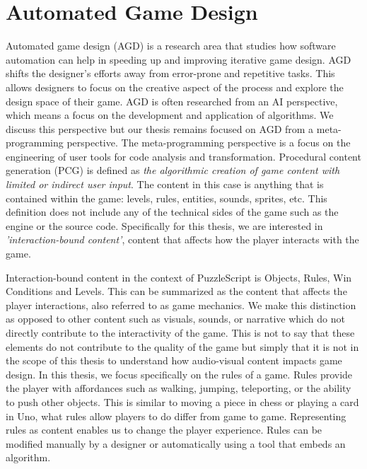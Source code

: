 \section{Automated Game Design}

Automated game design (AGD) is a research area that studies how software automation can help in speeding up and improving iterative game design. AGD shifts the designer's efforts away from error-prone and repetitive tasks. This allows designers to focus on the creative aspect of the process and explore the design space of their game. AGD is often researched from an AI perspective, which means a focus on the development and application of algorithms. We discuss this perspective but our thesis remains focused on AGD from a meta-programming perspective. The meta-programming perspective is a focus on the engineering of user tools for code analysis and transformation. Procedural content generation (PCG) is defined as \textit{the algorithmic creation of game content with limited or indirect user input}\cite{proceduraltogelius2011}. The content in this case is anything that is contained within the game: levels, rules, entities, sounds, sprites, etc. This definition does not include any of the technical sides of the game such as the engine or the source code. Specifically for this thesis, we are interested in \textit{'interaction-bound content'}, content that affects how the player interacts with the game. 

Interaction-bound content in the context of PuzzleScript is Objects, Rules, Win Conditions and Levels. This can be summarized as the content that affects the player interactions, also referred to as game mechanics. We make this distinction as opposed to other content such as visuals, sounds, or narrative which do not directly contribute to the interactivity of the game. This is not to say that these elements do not contribute to the quality of the game but simply that it is not in the scope of this thesis to understand how audio-visual content impacts game design. In this thesis, we focus specifically on the rules of a game. Rules provide the player with affordances such as walking, jumping, teleporting, or the ability to push other objects. This is similar to moving a piece in chess or playing a card in Uno, what rules allow players to do differ from game to game. Representing rules as content enables us to change the player experience. Rules can be modified manually by a designer or automatically using a tool that embeds an algorithm.

